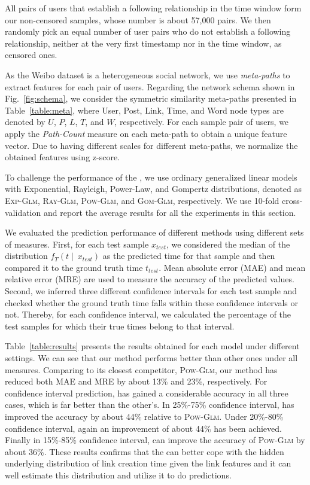 All pairs of users that establish a following relationship in the time window form our non-censored samples, whose number is about 57,000 pairs. We then randomly pick an equal number of user pairs who do not establish a following relationship, neither at the very first timestamp nor in the time window, as censored ones.

As the Weibo dataset is a heterogeneous social network, we use \emph{meta-paths} \cite{sun2011pathsim} to extract features for each pair of users. Regarding the network schema shown in Fig.~\ref{fig:schema}, we consider the symmetric similarity meta-paths presented in Table~\ref{table:meta}, where User, Post, Link, Time, and Word node types are denoted by $ U $, $ P $, $ L $, $ T $, and $ W $, respectively. For each sample pair of users, we apply the \emph{Path-Count} measure \cite{sun2011pathsim} on each meta-path to obtain a unique feature vector. Due to having different scales for different meta-paths, we normalize the obtained features using z-score.

To challenge the performance of the \npglm, we use ordinary generalized linear models with Exponential, Rayleigh, Power-Law, and Gompertz distributions, denoted as \textsc{Exp-Glm}, \textsc{Ray-Glm}, \textsc{Pow-Glm}, and \textsc{Gom-Glm}, respectively. We use 10-fold cross-validation and report the average results for all the experiments in this section.


We evaluated the prediction performance of different methods using different sets of measures. First, for each test sample $x_{test}$, we considered the median of the distribution $f_T(t\mid~x_{test})$ as the predicted time for that sample and then compared it to the ground truth time $t_{test}$. Mean absolute error (MAE) and mean relative error (MRE) are used to measure the accuracy of the predicted values. Second, we inferred three different confidence intervals for each test sample and checked whether the ground truth time falls within these confidence intervals or not. Thereby, for each confidence interval, we calculated the percentage of the test samples for which their true times belong to that interval.

Table~\ref{table:results} presents the results obtained for each model under different settings. We can see that our \npglm method performs better than other ones under all measures. Comparing to its closest competitor, \textsc{Pow-Glm}, our method has reduced both MAE and MRE by about 13\% and 23\%, respectively. For confidence interval prediction, \npglm has gained a considerable accuracy in all three cases, which is far better than the other's. In 25\%-75\% confidence interval, \npglm has improved the accuracy by about 44\% relative to \textsc{Pow-Glm}. Under 20\%-80\% confidence interval, again an improvement of about 44\% has been achieved. Finally in 15\%-85\% confidence interval, \npglm can improve the accuracy of  \textsc{Pow-Glm} by about 36\%. These results confirms that the \npglm can better cope with the hidden underlying distribution of link creation time given the link features and it can well estimate this distribution and utilize it to do predictions.

